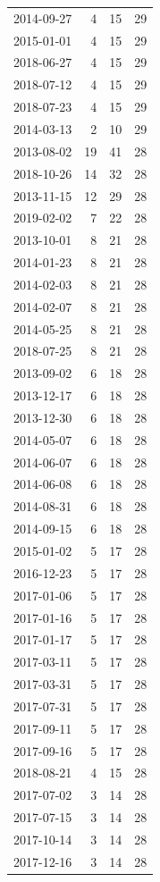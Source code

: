 \begin{tabular}{lrrr}
2014-09-27 & 4 & 15 & 29 \\
2015-01-01 & 4 & 15 & 29 \\
2018-06-27 & 4 & 15 & 29 \\
2018-07-12 & 4 & 15 & 29 \\
2018-07-23 & 4 & 15 & 29 \\
2014-03-13 & 2 & 10 & 29 \\
2013-08-02 & 19 & 41 & 28 \\
2018-10-26 & 14 & 32 & 28 \\
2013-11-15 & 12 & 29 & 28 \\
2019-02-02 & 7 & 22 & 28 \\
2013-10-01 & 8 & 21 & 28 \\
2014-01-23 & 8 & 21 & 28 \\
2014-02-03 & 8 & 21 & 28 \\
2014-02-07 & 8 & 21 & 28 \\
2014-05-25 & 8 & 21 & 28 \\
2018-07-25 & 8 & 21 & 28 \\
2013-09-02 & 6 & 18 & 28 \\
2013-12-17 & 6 & 18 & 28 \\
2013-12-30 & 6 & 18 & 28 \\
2014-05-07 & 6 & 18 & 28 \\
2014-06-07 & 6 & 18 & 28 \\
2014-06-08 & 6 & 18 & 28 \\
2014-08-31 & 6 & 18 & 28 \\
2014-09-15 & 6 & 18 & 28 \\
2015-01-02 & 5 & 17 & 28 \\
2016-12-23 & 5 & 17 & 28 \\
2017-01-06 & 5 & 17 & 28 \\
2017-01-16 & 5 & 17 & 28 \\
2017-01-17 & 5 & 17 & 28 \\
2017-03-11 & 5 & 17 & 28 \\
2017-03-31 & 5 & 17 & 28 \\
2017-07-31 & 5 & 17 & 28 \\
2017-09-11 & 5 & 17 & 28 \\
2017-09-16 & 5 & 17 & 28 \\
2018-08-21 & 4 & 15 & 28 \\
2017-07-02 & 3 & 14 & 28 \\
2017-07-15 & 3 & 14 & 28 \\
2017-10-14 & 3 & 14 & 28 \\
2017-12-16 & 3 & 14 & 28 \\

\end{tabular}
